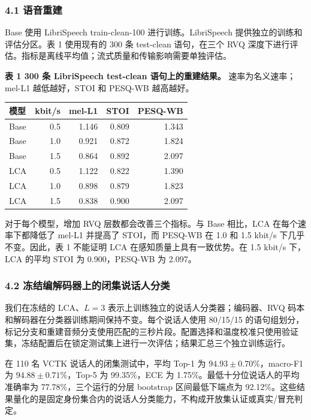 \documentclass[12pt]{article}
\newcounter{none}
\begin{document}
\subsubsection{4.1 语音重建}\label{ux8bedux97f3ux91cdux5efa}

Base 使用 LibriSpeech train-clean-100 进行训练。LibriSpeech
提供独立的训练和评估分区。表 1 使用现有的 300 条 test-clean 语句，在三个
RVQ 深度下进行评估。指标是离线平均值；流式质量和传输影响需要单独评估。

\textbf{表 1 300 条 LibriSpeech test-clean 语句上的重建结果。}
速率为名义速率；mel-L1 越低越好，STOI 和 PESQ-WB 越高越好。

{\def\LTcaptype{none} %
\begin{longtable}[]{@{}lrrrr@{}}
\toprule\noalign{}
模型 & kbit/s & mel-L1 & STOI & PESQ-WB \\
\midrule\noalign{}
\endhead
\bottomrule\noalign{}
\endlastfoot
Base & 0.5 & 1.146 & 0.809 & 1.343 \\
Base & 1.0 & 0.921 & 0.872 & 1.824 \\
Base & 1.5 & 0.864 & 0.892 & 2.097 \\
LCA & 0.5 & 1.122 & 0.822 & 1.390 \\
LCA & 1.0 & 0.898 & 0.879 & 1.823 \\
LCA & 1.5 & 0.838 & 0.900 & 2.097 \\
\end{longtable}
}

对于每个模型，增加 RVQ 层数都会改善三个指标。与 Base 相比，LCA
在每个速率下都降低了 mel-L1 并提高了 STOI，而 PESQ-WB 在 1.0 和 1.5
kbit/s 下几乎不变。因此，表 1 不能证明 LCA 在感知质量上具有一致优势。在
1.5 kbit/s 下，LCA 的平均 STOI 为 0.900，PESQ-WB 为 2.097。

\subsubsection{4.2 冻结编解码器上的闭集说话人分类}\label{speaker-closed-set-zh}

我们在冻结的 LCA、\(L=3\) 表示上训练独立的说话人分类器；编码器、RVQ
码本和解码器在分类器训练期间保持不变。每个说话人使用 80/15/15
的语句组划分，标记分支和重建音频分支使用匹配的三秒片段。配置选择和温度校准只使用验证集，冻结配置后在锁定测试集上进行一次评估；结果汇总三个独立训练运行。

在 110 名 VCTK 说话人的闭集测试中，平均 Top-1 为
\(94.93\pm0.70\%\)，macro-F1 为 \(94.88\pm0.71\%\)，Top-5 为
99.35\%，ECE 为 1.75\%。最低十分位说话人的平均准确率为 77.78\%，三个运行的分层 bootstrap 区间最低下端点为 92.12\%。这些结果量化的是固定身份集合内的说话人分类能力，不构成开放集认证或真实/冒充判定。
\end{document}
